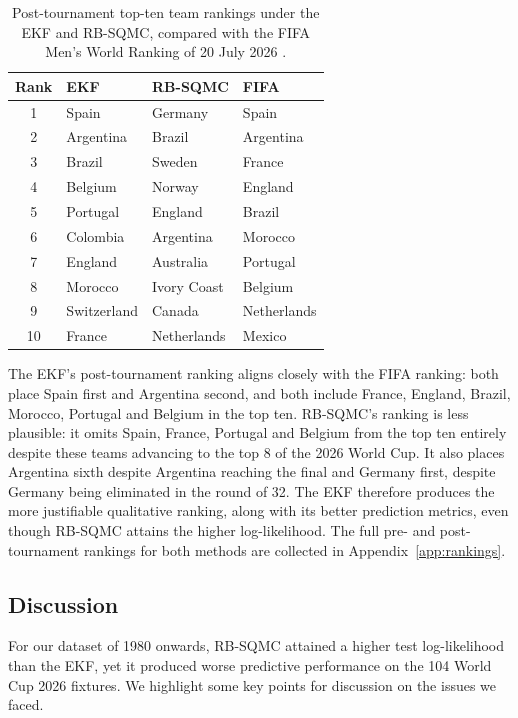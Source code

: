 \begin{table}[H]
\centering
\begin{tabular}{clll}
\toprule
Rank & EKF & RB-SQMC & FIFA \\
\midrule
1 & Spain & Germany & Spain \\
2 & Argentina & Brazil & Argentina \\
3 & Brazil & Sweden & France \\
4 & Belgium & Norway & England \\
5 & Portugal & England & Brazil \\
6 & Colombia & Argentina & Morocco \\
7 & England & Australia & Portugal \\
8 & Morocco & Ivory Coast & Belgium \\
9 & Switzerland & Canada & Netherlands \\
10 & France & Netherlands & Mexico \\
\bottomrule
\end{tabular}
\caption{Post-tournament top-ten team rankings under the EKF and RB-SQMC, compared with the FIFA Men's World Ranking of 20 July 2026 \citep{fifaworldranking2026}.}
\label{tab:fifa-comparison}
\end{table}

The EKF's post-tournament ranking aligns closely with the FIFA ranking: both place Spain first and Argentina second, and both include France, England, Brazil, Morocco, Portugal and Belgium in the top ten. RB-SQMC's ranking is less plausible: it omits Spain, France, Portugal and Belgium from the top ten entirely despite these teams advancing to the top 8 of the 2026 World Cup. It also places Argentina sixth despite Argentina reaching the final and Germany first, despite Germany being eliminated in the round of 32. The EKF therefore produces the more justifiable qualitative ranking, along with its better prediction metrics, even though RB-SQMC attains the higher log-likelihood. The full pre- and post-tournament rankings for both methods are collected in Appendix~\ref{app:rankings}.

\subsection{Discussion}
\label{sec:performance-comparison-limitations}

For our dataset of 1980 onwards, RB-SQMC attained a higher test log-likelihood than the EKF, yet it produced worse predictive performance on the 104 World Cup 2026 fixtures. We highlight some key points for discussion on the issues we faced.

